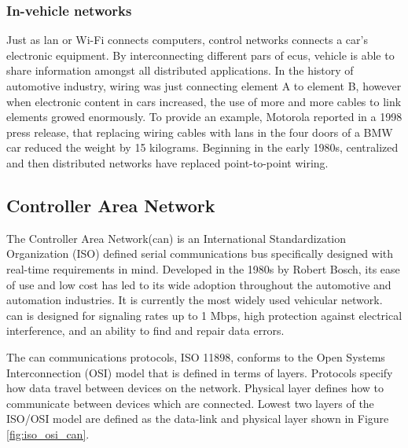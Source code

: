 \subsubsection{In-vehicle networks} %
\label{ssub:in_vehicle_networks}
Just as \gls{lan} or Wi-Fi connects computers, control networks connects a car's electronic equipment. By interconnecting different pars of \glspl{ecu}, vehicle is able to share information amongst all distributed applications. In the history of automotive industry, wiring was just connecting element A to element B, however when electronic content in cars increased, the use of more and more cables to link elements growed enormously. To provide an example, Motorola reported in a 1998 press release, that replacing wiring cables with \gls{lan}s in the four doors of a BMW car reduced the weight by 15 kilograms. Beginning in the early 1980s, centralized and then distributed networks have replaced point-to-point wiring.\cite{815878}
\subsection{Controller Area Network} %
\label{sub:controller_area_network}
The Controller Area Network(\gls{can}) is an International Standardization Organization (ISO) defined serial communications bus  specifically designed with real-time requirements in mind. Developed in the 1980s by Robert Bosch, its ease of use and low cost has led to its wide adoption throughout the automotive and automation industries\cite{788104}. It is currently the most widely used vehicular network\cite{976923}. \gls{can} is designed for signaling rates up to 1 Mbps, high protection against electrical interference, and an ability to find and repair data errors.

The \gls{can} communications protocols,  ISO 11898, conforms to the Open Systems Interconnection (OSI) model that is defined in terms of layers. Protocols specify how data travel between devices on the network. Physical layer defines how to communicate between devices which are connected. Lowest two layers of the ISO/OSI model are defined as the data-link and physical layer shown in Figure \ref{fig:iso_osi_can}.

